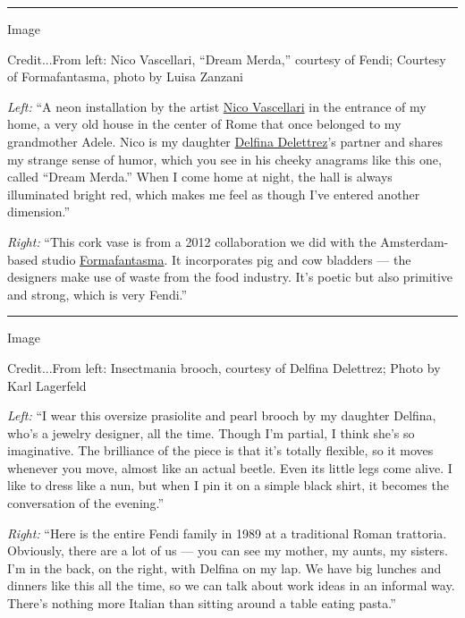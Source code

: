 \begin{center}\rule{0.5\linewidth}{\linethickness}\end{center}

Image

Credit...From left: Nico Vascellari, ``Dream Merda,'' courtesy of Fendi;
Courtesy of Formafantasma, photo by Luisa Zanzani

\emph{Left:} ``A neon installation by the artist
\href{http://www.nicovascellari.com/}{Nico Vascellari} in the entrance
of my home, a very old house in the center of Rome that once belonged to
my grandmother Adele. Nico is my daughter
\href{https://www.nytimes.com/2016/02/08/t-magazine/fashion/delfina-delettrez-fendis-whimsical-jewelry-and-many-inspirations.html}{Delfina
Delettrez}'s partner and shares my strange sense of humor, which you see
in his cheeky anagrams like this one, called ``Dream Merda.'' When I
come home at night, the hall is always illuminated bright red, which
makes me feel as though I've entered another dimension.''

\emph{Right:} ``This cork vase is from a 2012 collaboration we did with
the Amsterdam-based studio
\href{https://www.nytimes.com/2016/10/20/t-magazine/design/studio-formafantasma-andrea-trimarchi-simone-farresin.html}{Formafantasma}.
It incorporates pig and cow bladders --- the designers make use of waste
from the food industry. It's poetic but also primitive and strong, which
is very Fendi.''

\begin{center}\rule{0.5\linewidth}{\linethickness}\end{center}

Image

Credit...From left: Insectmania brooch, courtesy of Delfina Delettrez;
Photo by Karl Lagerfeld

\emph{Left:} ``I wear this oversize prasiolite and pearl brooch by my
daughter Delfina, who's a jewelry designer, all the time. Though I'm
partial, I think she's so imaginative. The brilliance of the piece is
that it's totally flexible, so it moves whenever you move, almost like
an actual beetle. Even its little legs come alive. I like to dress like
a nun, but when I pin it on a simple black shirt, it becomes the
conversation of the evening.''

\emph{Right:} ``Here is the entire Fendi family in 1989 at a traditional
Roman trattoria. Obviously, there are a lot of us --- you can see my
mother, my aunts, my sisters. I'm in the back, on the right, with
Delfina on my lap. We have big lunches and dinners like this all the
time, so we can talk about work ideas in an informal way. There's
nothing more Italian than sitting around a table eating pasta.''

